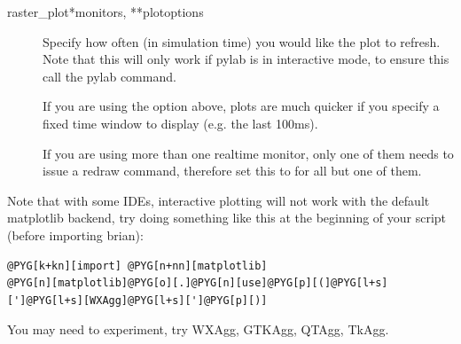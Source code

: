 \documentclass[letterpaper,10pt,english]{manual}
\begin{document}
\begin{funcdesc}{raster\_plot}{*monitors, **plotoptions}
\begin{description}
\item[] \leavevmode
Specify how often (in simulation time) you would like the plot to
refresh. Note that this will only work if pylab is in interactive mode,
to ensure this call the pylab  command.

\item[] \leavevmode
If you are using the  option above, plots are much quicker
if you specify a fixed time window to display (e.g. the last 100ms).

\item[] \leavevmode
If you are using more than one realtime monitor, only one of them needs
to issue a redraw command, therefore set this to  for all but
one of them.

\end{description}

Note that with some IDEs, interactive plotting will not work with the
default matplotlib backend, try doing something like this at the
beginning of your script (before importing brian):

\begin{Verbatim}[commandchars=@\[\]]
@PYG[k+kn][import] @PYG[n+nn][matplotlib]
@PYG[n][matplotlib]@PYG[o][.]@PYG[n][use]@PYG[p][(]@PYG[l+s][']@PYG[l+s][WXAgg]@PYG[l+s][']@PYG[p][)]
\end{Verbatim}

You may need to experiment, try WXAgg, GTKAgg, QTAgg, TkAgg.
\end{funcdesc}
\end{document}
